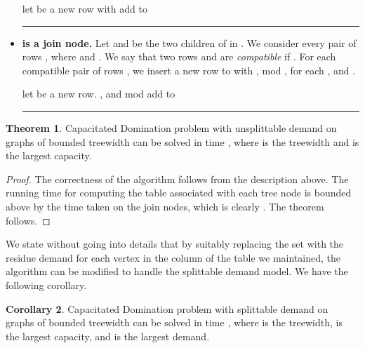 \documentclass[a4paper,11pt]{article}
\theoremstyle{definition}
\newtheorem{theorem}{Theorem}
\newtheorem{corollary}[theorem]{Corollary}
\begin{document}
\begin{itemize}
\smallskip

\begin{algorithmic}[1]
	\STATE let  be a new row with 
	\STATE add  to 
\ENDFOR
\newline \rule{\linewidth}{0.2mm}
\end{algorithmic}

\item{\bf  is a join node.} Let  and  be the two children of  in . We consider every pair of rows ,  where  and . We say that two rows  and  are {\em compatible} if . For each compatible pair of rows , we insert a new row  to  with ,  mod , for each , and .

\smallskip

\begin{algorithmic}[1]
	\STATE let  be a new row.
	\STATE , and
	\STATE  mod 
	\STATE add  to 
\ENDFOR
\newline \rule{\linewidth}{0.2mm}
\end{algorithmic}

\end{itemize}

\begin{theorem}
Capacitated Domination problem with unsplittable demand on graphs of bounded treewidth can be solved in time , where  is the treewidth and  is the largest capacity.
\end{theorem}

\begin{proof}
The correctness of the algorithm follows from the description above. The running time for computing the table  associated with each tree node  is bounded above by the time taken on the join nodes, which is clearly . The theorem follows.
\end{proof}

\smallskip

We state without going into details that by suitably replacing the set  with the residue demand  for each vertex  in the column of the table we maintained, the algorithm can be modified to handle the splittable demand model. We have the following corollary.

\begin{corollary}
Capacitated Domination problem with splittable demand on graphs of bounded treewidth can be solved in time , where  is the treewidth,  is the largest capacity, and  is the largest demand.
\end{corollary}
\end{document}
